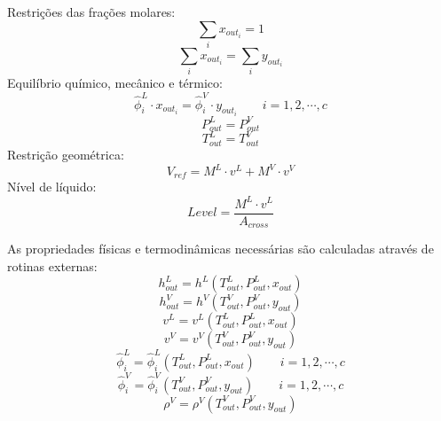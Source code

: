 Restrições das frações molares:
\begin{equation}
\sum_i x_{out_i} = 1
\end{equation}
\begin{equation}
\sum_i x_{out_i} = \sum_i y_{out_i}
\end{equation}
Equilíbrio químico, mecânico e térmico:
\begin{equation}
\hat{\phi}_i^L \cdot x_{out_i} = \hat{\phi}_i^V \cdot y_{out_i} \qquad i=1,2,\cdots,c
\end{equation}
\begin{equation}
P_{out}^L = P_{out}^V
\end{equation}
\begin{equation}
T_{out}^L = T_{out}^V
\end{equation}
Restrição geométrica:
\begin{equation}
V_{ref} = M^L \cdot v^L + M^V \cdot v^V 
\end{equation}
Nível de líquido:
\begin{equation}
Level = \dfrac {M^L \cdot v^L}{A_{cross}}
\end{equation}

As propriedades físicas e termodinâmicas necessárias são calculadas através de rotinas externas:
\begin{equation}
h_{out}^L = h^L(T_{out}^L, P_{out}^L, x_{out})
\end{equation}
\begin{equation}
h_{out}^V = h^V(T_{out}^V, P_{out}^V, y_{out})
\end{equation}
\begin{equation}
v^L = v^L(T_{out}^L, P_{out}^L, x_{out})
\end{equation}
\begin{equation}
v^V = v^V(T_{out}^V, P_{out}^V, y_{out})
\end{equation}
\begin{equation}
\hat{\phi}_i^L = \hat{\phi}_i^L(T_{out}^L, P_{out}^L, x_{out}) \qquad
i=1,2,\cdots,c
\end{equation}
\begin{equation}
\hat{\phi}_i^V = \hat{\phi}_i^V(T_{out}^V, P_{out}^V, y_{out}) \qquad
i=1,2,\cdots,c
\end{equation}
\begin{equation}
\rho^V = \rho^V(T_{out}^V, P_{out}^V, y_{out})
\end{equation}

